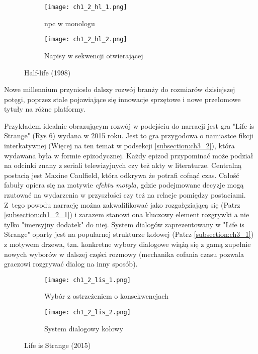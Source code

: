 \begin{figure}[h]
    \begin{subfigure}{0.49\textwidth}
        \caption{\gls{npc} w monologu}
        \texttt{[image: ch1\_2\_hl\_1.png]}
        \label{subfig:ch_1_2_hl_1}
    \end{subfigure}
    \begin{subfigure}{0.49\textwidth}
        \caption{Napisy w sekwencji otwierającej}
        \texttt{[image: ch1\_2\_hl\_2.png]}
        \label{subfig:ch_1_2_hl_2}
    \end{subfigure}
    \caption{Half-life (1998)}
    \label{fig:ch1_2_hl}
\end{figure}

\newpage

Nowe millennium przyniosło dalszy rozwój branży do rozmiarów dzisiejszej potęgi, poprzez stale
pojawiające się innowacje sprzętowe i nowe przełomowe tytuły na różne platformy.

Przykładem idealnie obrazującym rozwój w podejściu do narracji jest gra "Life is Strange" (Rys \ref{fig:ch1_2_lis})
wydana w 2015 roku. Jest to gra przygodowa o namiastce fikcji interkatywnej (Więcej na ten temat
w podsekcji \ref{subsection:ch3_2}), która wydawana była w formie epizodycznej. Każdy epizod
przypominać może podział na odcinki znany z seriali telewizyjnych czy też akty w literaturze.
Centralną postacią jest Maxine Caulfield, która odkrywa że potrafi cofnąć czas. Całość fabuły opiera się
na motywie \textit{efektu motyla}, gdzie podejmowane decyzje mogą rzutować na wydarzenia w przyszłości czy
też na relacje pomiędzy postaciami. Z~tego powodu narrację można zakwalifikować jako rozgałęziającą się
(Patrz \ref{subsection:ch1_2_1}) i zarazem stanowi ona kluczowy element rozgrywki a nie tylko
"imersyjny dodatek" do niej. System dialogów zaprezentowany w "Life is Strange" oparty jest na popularnej
strukturze kołowej (Patrz \ref{subsection:ch3_1}) z motywem drzewa, tzn. konkretne wybory dialogowe
wiążą się z gamą zupełnie nowych wyborów w dalszej części rozmowy (mechanika cofania czasu pozwala
graczowi rozgrywać dialog na inny sposób).

\begin{figure}[h]
    \begin{subfigure}{0.49\textwidth}
        \caption{Wybór z ostrzeżeniem o konsekwencjach}
        \texttt{[image: ch1\_2\_lis\_1.png]}
        \label{subfig:ch_1_2_lis_1}
    \end{subfigure}
    \begin{subfigure}{0.49\textwidth}
        \caption{System dialogowy kołowy}
        \texttt{[image: ch1\_2\_lis\_2.png]}
        \label{subfig:ch_1_2_lis_2}
    \end{subfigure}
    \caption{Life is Strange (2015)}
    \label{fig:ch1_2_lis}
\end{figure}

